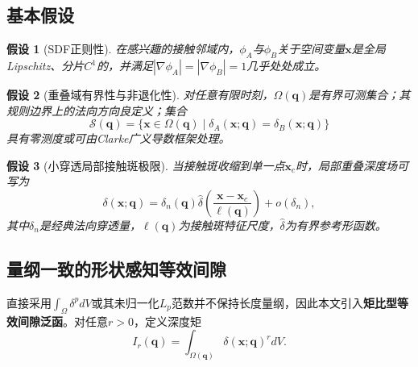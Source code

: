 ﻿\documentclass[12pt, a4paper]{ctexart}
\theoremstyle{plain}
\newtheorem{assumption}{假设}
\theoremstyle{remark}
\begin{document}
\subsection{基本假设}
\begin{assumption}[SDF正则性]\label{ass:sdf}
在感兴趣的接触邻域内，$\phi_A$与$\phi_B$关于空间变量$\bm{x}$是全局Lipschitz、分片$C^1$的，并满足$|\nabla \phi_A| = |\nabla \phi_B| = 1$几乎处处成立。
\end{assumption}

\begin{assumption}[重叠域有界性与非退化性]\label{ass:domain}
对任意有限时刻，$\Omega(\bm{q})$是有界可测集合；其规则边界上的法向方向良定义；集合
\begin{equation}
    \mathcal{S}(\bm{q}) = \{ \bm{x} \in \Omega(\bm{q}) \mid \delta_A(\bm{x};\bm{q}) = \delta_B(\bm{x};\bm{q}) \}
\end{equation}
具有零测度或可由Clarke广义导数框架处理。
\end{assumption}

\begin{assumption}[小穿透局部接触斑极限]\label{ass:small}
当接触斑收缩到单一点$\bm{x}_c$时，局部重叠深度场可写为
\begin{equation}
    \delta(\bm{x};\bm{q}) = \delta_n(\bm{q}) \hat{\delta}\!\left( \frac{\bm{x} - \bm{x}_c}{\ell(\bm{q})} \right) + o(\delta_n),
\end{equation}
其中$\delta_n$是经典法向穿透量，$\ell(\bm{q})$为接触斑特征尺度，$\hat{\delta}$为有界参考形函数。
\end{assumption}

\subsection{量纲一致的形状感知等效间隙}
直接采用$\int_\Omega \delta^p dV$或其未归一化$L_p$范数并不保持长度量纲，因此本文引入\textbf{矩比型等效间隙泛函}。对任意$r>0$，定义深度矩
\begin{equation}
    I_r(\bm{q}) = \int_{\Omega(\bm{q})} \delta(\bm{x};\bm{q})^r dV .
\end{equation}
\end{document}
